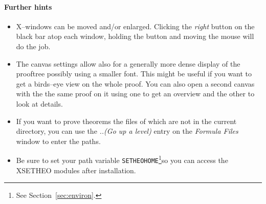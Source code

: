 \paragraph{Further hints}
\begin{itemize}
\item X--windows can be moved and/or enlarged. Clicking the {\it
right\/} button on the black bar atop each window, holding the button
and moving the mouse will do the job.
\item The canvas settings allow also for a generally more dense
display of the prooftree possibly using a smaller font. This might be
useful if you want to get a birds--eye view on the whole proof. You
can also open a second canvas with the the same proof on it using one
to get an overview and the other to look at details.
\item If you want to prove theorems the files of which are not in the
current directory, you can use the {\it ..(Go up a level)\/} entry on
the {\it Formula Files\/} window to enter the paths.
\item Be sure to set your path variable {\tt SETHEOHOME}\footnote{See
Section~\ref{sec:environ}.}so you can access the XSETHEO modules after
installation.
\end{itemize}
